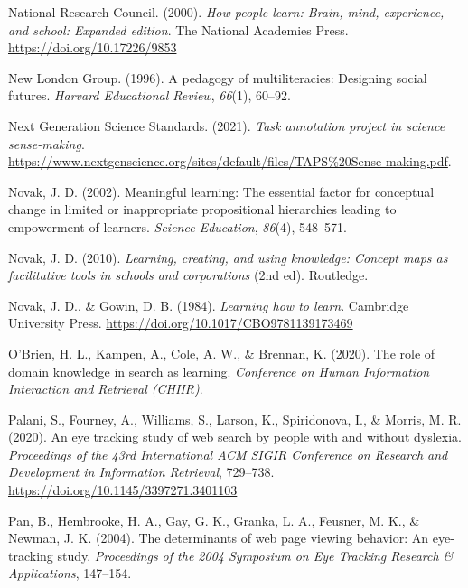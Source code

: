 \documentclass[letterpaper, nobind]{templates/ociamthesis}
\newlength{\cslhangindent}
\newenvironment{CSLReferences}[2] %
 {%
  \setlength{\parindent}{0pt}
  \ifodd #1
  \let\oldpar\par
  \def\par{\hangindent=\cslhangindent\oldpar}
  \fi
  \setlength{\parskip}{1mm}
  \setlength{\baselineskip}{6mm}
 }%
 {}
\begin{document}
\begin{CSLReferences}{1}{0}
\leavevmode{}%
National Research Council. (2000). \emph{How people learn: {Brain}, mind, experience, and school: {Expanded} edition}. {The National Academies Press}. \url{https://doi.org/10.17226/9853}

\leavevmode{}%
New London Group. (1996). A pedagogy of multiliteracies: Designing social futures. \emph{Harvard Educational Review}, \emph{66}(1), 60--92.

\leavevmode{}%
Next Generation Science Standards. (2021). \emph{Task annotation project in science \textbar{} sense-making}. \url{https://www.nextgenscience.org/sites/default/files/TAPS\%20Sense-making.pdf}.

\leavevmode{}%
Novak, J. D. (2002). Meaningful learning: The essential factor for conceptual change in limited or inappropriate propositional hierarchies leading to empowerment of learners. \emph{Science Education}, \emph{86}(4), 548--571.

\leavevmode{}%
Novak, J. D. (2010). \emph{Learning, creating, and using knowledge: Concept maps as facilitative tools in schools and corporations} (2nd ed). {Routledge}.

\leavevmode{}%
Novak, J. D., \& Gowin, D. B. (1984). \emph{Learning how to learn}. Cambridge University Press. \url{https://doi.org/10.1017/CBO9781139173469}

\leavevmode{}%
O'Brien, H. L., Kampen, A., Cole, A. W., \& Brennan, K. (2020). The role of domain knowledge in search as learning. \emph{Conference on Human Information Interaction and Retrieval (CHIIR)}.

\leavevmode{}%
Palani, S., Fourney, A., Williams, S., Larson, K., Spiridonova, I., \& Morris, M. R. (2020). An eye tracking study of web search by people with and without dyslexia. \emph{Proceedings of the 43rd International ACM SIGIR Conference on Research and Development in Information Retrieval}, 729--738. \url{https://doi.org/10.1145/3397271.3401103}

\leavevmode{}%
Pan, B., Hembrooke, H. A., Gay, G. K., Granka, L. A., Feusner, M. K., \& Newman, J. K. (2004). The determinants of web page viewing behavior: An eye-tracking study. \emph{Proceedings of the 2004 Symposium on Eye Tracking Research \& Applications}, 147--154.


\end{CSLReferences}
\end{document}
